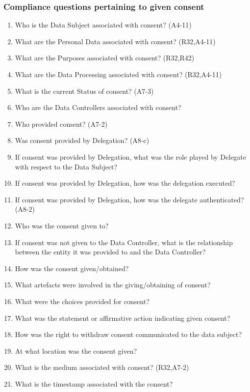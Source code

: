 \subsubsection{Compliance questions pertaining to given consent}\label{sec:info:CQ:5}
\begin{enumerate}[label={\textit{CMQ.\theenumi}},resume]
    \item Who is the Data Subject associated with consent? (A4-11)
    \item What are the Personal Data associated with consent? (R32,A4-11)
    \item What are the Purposes associated with consent? (R32,R42)
    \item What are the Data Processing associated with consent? (R32,A4-11)
    \item What is the current Status of consent? (A7-3)
    \item Who are the Data Controllers associated with consent?
    \item Who provided consent? (A7-2)
    \item Was consent provided by Delegation? (A8-c)
    \item If consent was provided by Delegation, what was the role played by Delegate with respect to the Data Subject?
    \item If consent was provided by Delegation, how was the delegation executed?
    \item If consent was provided by Delegation, how was the delegate authenticated? (A8-2)
    \item Who was the consent given to?
    \item If consent was not given to the Data Controller, what is the relationship between the entity it was provided to and the Data Controller?
    \item How was the consent given/obtained?
    \item What artefacts were involved in the giving/obtaining of consent?
    \item What were the choices provided for consent?
    \item What was the statement or affirmative action indicating given consent?
    \item How was the right to withdraw consent communicated to the data subject?
    \item At what location was the consent given?
    \item What is the medium associated with consent? (R32,A7-2)
    \item What is the timestamp associated with the consent?

\end{enumerate}
